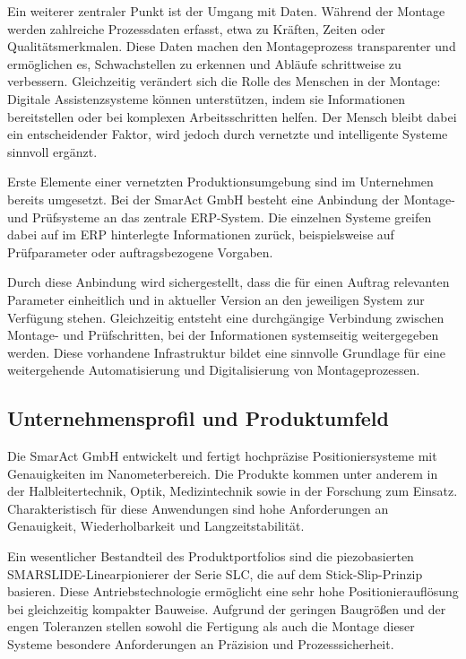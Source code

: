 Ein weiterer zentraler Punkt ist der Umgang mit Daten. Während der Montage werden zahlreiche Prozessdaten erfasst, etwa zu Kräften, Zeiten oder Qualitätsmerkmalen. Diese Daten machen den Montageprozess transparenter und ermöglichen es, Schwachstellen zu erkennen und Abläufe schrittweise zu verbessern. Gleichzeitig verändert sich die Rolle des Menschen in der Montage: Digitale Assistenzsysteme können unterstützen, indem sie Informationen bereitstellen oder bei komplexen Arbeitsschritten helfen. Der Mensch bleibt dabei ein entscheidender Faktor, wird jedoch durch vernetzte und intelligente Systeme sinnvoll ergänzt.

Erste Elemente einer vernetzten Produktionsumgebung sind im Unternehmen bereits umgesetzt. Bei der SmarAct GmbH besteht eine Anbindung der Montage- und Prüfsysteme an das zentrale ERP-System. Die einzelnen Systeme greifen dabei auf im ERP hinterlegte Informationen zurück, beispielsweise auf Prüfparameter oder auftragsbezogene Vorgaben.

Durch diese Anbindung wird sichergestellt, dass die für einen Auftrag relevanten Parameter einheitlich und in aktueller Version an den jeweiligen System zur Verfügung stehen. Gleichzeitig entsteht eine durchgängige Verbindung zwischen Montage- und Prüfschritten, bei der Informationen systemseitig weitergegeben werden. Diese vorhandene Infrastruktur bildet eine sinnvolle Grundlage für eine weitergehende Automatisierung und Digitalisierung von Montageprozessen.

\subsection{Unternehmensprofil und Produktumfeld}
Die SmarAct GmbH entwickelt und fertigt hochpräzise Positioniersysteme mit Genauigkeiten im Nanometerbereich. Die Produkte kommen unter anderem in der Halbleitertechnik, Optik, Medizintechnik sowie in der Forschung zum Einsatz. Charakteristisch für diese Anwendungen sind hohe Anforderungen an Genauigkeit, Wiederholbarkeit und Langzeitstabilität.\cite{SmarAct_Company}

Ein wesentlicher Bestandteil des Produktportfolios sind die piezobasierten SMARSLIDE-Linearpionierer der Serie SLC, die auf dem Stick-Slip-Prinzip basieren. Diese Antriebstechnologie ermöglicht eine sehr hohe Positionierauflösung bei gleichzeitig kompakter Bauweise. Aufgrund der geringen Baugrößen und der engen Toleranzen stellen sowohl die Fertigung als auch die Montage dieser Systeme besondere Anforderungen an Präzision und Prozesssicherheit.

